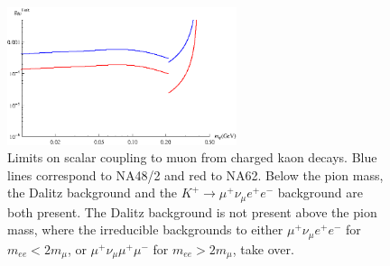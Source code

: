 \begin{figure}[h]
    \centering
    \includegraphics[width=0.6\textwidth]{Figures/limits/kaon_all}
    \caption{Limits on scalar coupling to muon from charged kaon decays. Blue lines correspond to NA48/2 and red to NA62. Below the pion mass, the Dalitz background and the $K^+ \rightarrow \mu^+ \nu_\mu e^+ e^-$ background are both present. The Dalitz background is not present above the pion mass, where the irreducible backgrounds to either $\mu^+ \nu_\mu e^+ e^-$ for $m_{ee} < 2m_\mu$, or $\mu^+ \nu_\mu \mu^+ \mu^-$ for $m_{ee} > 2m_\mu$, take over.}
    \label{fig:kaon_limits}
\end{figure}
